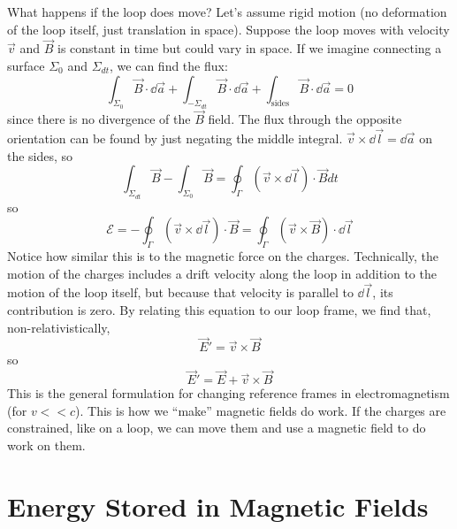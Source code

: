 \documentclass[a4paper,twoside,master.tex]{subfiles}
\begin{document}
What happens if the loop does move? Let's assume rigid motion (no deformation of the loop itself, just translation in space). Suppose the loop moves with velocity $ \vec{v} $ and $ \vec{B} $ is constant in time but could vary in space. If we imagine connecting a surface $ \Sigma_0 $ and $ \Sigma_{dt} $, we can find the flux:
\begin{equation}
    \int_{\Sigma_0} \vec{B} \cdot \dd{ \vec{a}} + \int_{- \Sigma_{dt}} \vec{B} \cdot \dd{ \vec{a}} + \int_{\text{sides}} \vec{B} \cdot \dd{ \vec{a}} = 0
\end{equation}
since there is no divergence of the $ \vec{B} $ field. The flux through the opposite orientation can be found by just negating the middle integral. $ \vec{v} \times \dd{ \vec{l}} = \dd{ \vec{a}} $ on the sides, so
\begin{equation}
    \int_{\Sigma_{dt}} \vec{B} - \int_{\Sigma_0} \vec{B} = \oint_{\Gamma} ( \vec{v} \times \dd{ \vec{l}}) \cdot \vec{B} dt
\end{equation}
so
\begin{equation}
    \mathscr{E} = - \oint_{\Gamma} ( \vec{v} \times \dd{ \vec{l}}) \cdot \vec{B} = \oint_{\Gamma} ( \vec{v} \times \vec{B} ) \cdot \dd{ \vec{l}}
\end{equation}
Notice how similar this is to the magnetic force on the charges. Technically, the motion of the charges includes a drift velocity along the loop in addition to the motion of the loop itself, but because that velocity is parallel to $ \dd{ \vec{l}} $, its contribution is zero. By relating this equation to our loop frame, we find that, non-relativistically,
\begin{equation}
    \vec{E}' = \vec{v} \times \vec{B}
\end{equation}
so
\begin{equation}
    \vec{E}' = \vec{E} + \vec{v} \times \vec{B}
\end{equation}
This is the general formulation for changing reference frames in electromagnetism (for $ v << c $). This is how we ``make'' magnetic fields do work. If the charges are constrained, like on a loop, we can move them and use a magnetic field to do work on them.

\section{Energy Stored in Magnetic Fields}
\label{sec:energy_stored_in_magnetic_fields}
\end{document}

